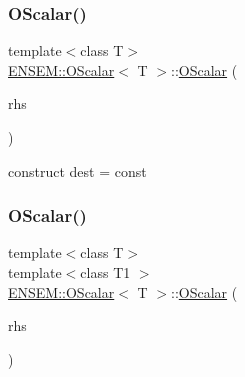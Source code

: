 \mbox{\label{classENSEM_1_1OScalar_a62bd0b52eff623c7e4911aa896c97ccf}} 
\subsubsection{\texorpdfstring{OScalar()}{OScalar()}\hspace{0.1cm}{\footnotesize\ttfamily [2/18]}}
{\footnotesize\ttfamily template$<$class T$>$ \\
\mbox{\hyperlink{classENSEM_1_1OScalar}{E\+N\+S\+E\+M\+::\+O\+Scalar}}$<$ T $>$\+::\mbox{\hyperlink{classENSEM_1_1OScalar}{O\+Scalar}} (\begin{DoxyParamCaption}\item[{const typename \mbox{\hyperlink{structENSEM_1_1WordType}{Word\+Type}}$<$ T $>$\+::Type\+\_\+t \&}]{rhs }\end{DoxyParamCaption})\hspace{0.3cm}{\ttfamily [inline]}}



construct dest = const 

\mbox{\label{classENSEM_1_1OScalar_a12d201aefa6cbf8648247fdcc6f08669}} 
\subsubsection{\texorpdfstring{OScalar()}{OScalar()}\hspace{0.1cm}{\footnotesize\ttfamily [3/18]}}
{\footnotesize\ttfamily template$<$class T$>$ \\
template$<$class T1 $>$ \\
\mbox{\hyperlink{classENSEM_1_1OScalar}{E\+N\+S\+E\+M\+::\+O\+Scalar}}$<$ T $>$\+::\mbox{\hyperlink{classENSEM_1_1OScalar}{O\+Scalar}} (\begin{DoxyParamCaption}\item[{const \mbox{\hyperlink{classENSEM_1_1OScalar}{O\+Scalar}}$<$ T1 $>$ \&}]{rhs }\end{DoxyParamCaption})\hspace{0.3cm}{\ttfamily [inline]}}



